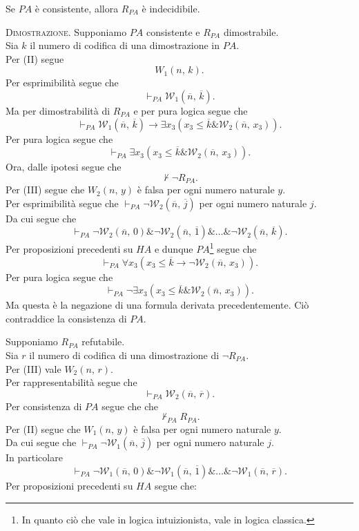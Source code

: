 	\begin{thm}
	Se $PA$ \`e consistente, allora $R_{PA}$ \`e indecidibile.
	\end{thm}
	\textsc{Dimostrazione.} Supponiamo $PA$ consistente e $R_{PA}$ dimostrabile.\\
	Sia $k$ il numero di codifica di una dimostrazione in $PA$.\\
	Per (II) segue 
		$$W_1(n,\,k).$$
	Per esprimibilit\`a segue che
		$$\vdash_{PA}\mathcal{W}_1(\overline{n},\,\overline{k}).$$
	Ma per dimostrabilit\`a di $R_{PA}$ e per pura logica segue che
		$$\vdash_{PA}\mathcal{W}_1(\overline{n},\,\overline{k})
		\rightarrow\exists x_3(x_3\leq\overline{k}\&\mathcal{W}_2
		(\overline{n},\,x_3)).$$
	Per pura logica segue che
		$$\vdash_{PA}\exists x_3(x_3\leq\overline{k}\&\mathcal{W}_2
		(\overline{n},\,x_3)).$$
	Ora, dalle ipotesi segue che
		$$\not\vdash\neg R_{PA}.$$
	Per (III) segue che $W_2(n,\,y)$ \`e falsa per ogni
	numero naturale $y$.\\
	Per esprimibilit\`a segue che $\vdash_{PA}
	\neg\mathcal{W}_2(\overline{n},\,\overline{j})$ per ogni numero naturale
	$j$.\\
	Da cui segue che 
		$$\vdash_{PA}
		\neg\mathcal{W}_2(\overline{n},\,0)\&
		\neg\mathcal{W}_2(\overline{n},\,\overline{1})\&
		\dots\&
		\neg\mathcal{W}_2(\overline{n},\,\overline{k}).$$
	Per proposizioni precedenti su $HA$ e dunque $PA$\footnote{In quanto
	ci\`o che vale in logica intuizionista, vale in logica classica.}
	segue che
		$$\vdash_{PA}\forall x_3(x_3\leq\overline{k}
		\rightarrow\neg\mathcal{W}_2(\overline{n},\,x_3)).$$
	Per pura logica segue che
		$$\vdash_{PA}\neg\exists x_3(x_3\leq\overline{k}
		\&\mathcal{W}_2(\overline{n},\,x_3)).$$
	Ma questa \`e la negazione di una formula derivata precedentemente.
	Ci\`o contraddice la consistenza di $PA$.
	
	Supponiamo $R_{PA}$ refutabile.\\
	Sia $r$ il numero di codifica di una
	dimostrazione di $\neg R_{PA}$.\\
	Per (III) vale $W_2(n,\,r)$.\\
	Per rappresentabilit\`a segue che 
		$$\vdash_{PA}\mathcal{W}_2(\overline{n},\,\overline{r}).$$
	Per consistenza di $PA$ segue che che 
		$$\not\vdash_{PA}R_{PA}.$$
	Per (II) segue che $W_1(n,\,y)$ \`e falsa per ogni
	numero naturale $y$.\\
	Da cui segue che $\vdash_{PA}\neg\mathcal{W}_1
	(\overline{n},\,\overline{j})$ per ogni numero naturale $j$.\\
	In particolare
		$$\vdash_{PA}\neg\mathcal{W}_1(\overline{n},\,0)\&
		\neg\mathcal{W}_1(\overline{n},\,\overline{1})\&\dots
		\&\neg\mathcal{W}_1(\overline{n},\,\overline{r}).$$
	Per proposizioni precedenti su $HA$ segue che:
	
